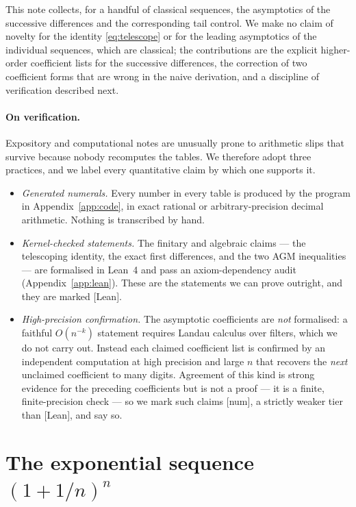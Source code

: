 \documentclass[11pt]{article}
\theoremstyle{plain}
\theoremstyle{remark}
\begin{document}
This note collects, for a handful of classical sequences, the asymptotics of the
successive differences and the corresponding tail control. We make no claim of
novelty for the identity \eqref{eq:telescope} or for the leading asymptotics of
the individual sequences, which are classical; the contributions are the
explicit higher-order coefficient lists for the successive differences, the
correction of two coefficient forms that are wrong in the naive derivation, and
a discipline of verification described next.

\paragraph{On verification.}
Expository and computational notes are unusually prone to arithmetic slips that
survive because nobody recomputes the tables. We therefore adopt three
practices, and we label every quantitative claim by which one supports it.
\begin{itemize}
  \item \emph{Generated numerals.} Every number in every table is produced by
        the program in Appendix~\ref{app:code}, in exact rational or
        arbitrary-precision decimal arithmetic. Nothing is transcribed by hand.
  \item \emph{Kernel-checked statements.} The finitary and algebraic claims ---
        the telescoping identity, the exact first differences, and the two AGM
        inequalities --- are formalised in Lean~4 and pass an
        axiom-dependency audit (Appendix~\ref{app:lean}). These are the
        statements we can prove outright, and they are marked \textsf{[Lean]}.
  \item \emph{High-precision confirmation.} The asymptotic coefficients are
        \emph{not} formalised: a faithful $O(n^{-k})$ statement requires Landau
        calculus over filters, which we do not carry out. Instead each claimed
        coefficient list is confirmed by an independent computation at high
        precision and large $n$ that recovers the \emph{next} unclaimed
        coefficient to many digits. Agreement of this kind is strong evidence
        for the preceding coefficients but is not a proof --- it is a finite,
        finite-precision check --- so we mark such claims \textsf{[num]}, a
        strictly weaker tier than \textsf{[Lean]}, and say so.
\end{itemize}

\section{The exponential sequence \texorpdfstring{$(1+1/n)^n$}{(1+1/n)\^{}n}}
\label{sec:e}
\end{document}

